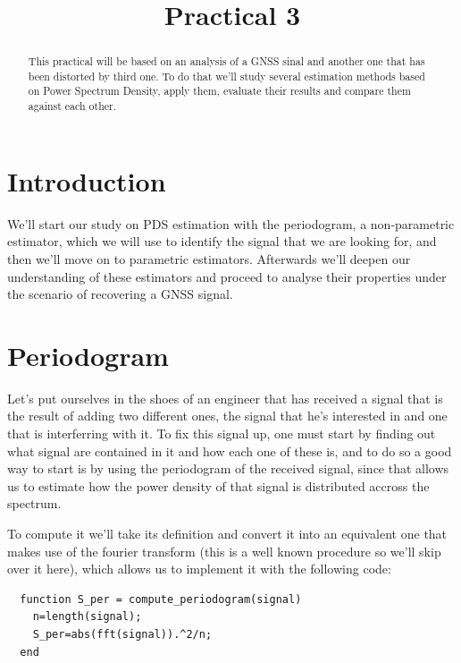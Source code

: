 \documentclass[conference,9pt]{IEEEtran}
\begin{document}
\title{Practical 3}

\author{
}


\maketitle
\begin{abstract}
This practical will be based on an analysis of a GNSS sinal and another one that has been distorted by third one. To do that we'll study several estimation methods based on Power Spectrum Density, apply them, evaluate their results and compare them against each other.
\end{abstract}

\section{Introduction}
We'll start our study on PDS estimation with the periodogram, a non-parametric estimator, which we will use to identify the signal that we are looking for, and then we'll move on to parametric estimators. Afterwards we'll deepen our understanding of these estimators and proceed to analyse their properties under the scenario of recovering a GNSS signal. 

\section{Periodogram}

Let's put ourselves in the shoes of an engineer that has received a signal that is the result of adding two different ones, the signal that he's interested in and one that is interferring with it. To fix this signal up, one must start by finding out what signal are contained in it and how each one of these is, and to do so a good way to start is by using the periodogram of the received signal, since that allows us to estimate how the power density of that signal is distributed accross the spectrum.

To compute it we'll take its definition and convert it into an equivalent one that makes use of the fourier transform (this is a well known procedure so we'll skip over it here), which allows us to implement it with the following code:
\begin{verbatim}
  function S_per = compute_periodogram(signal)
    n=length(signal);
    S_per=abs(fft(signal)).^2/n;
  end
\end{verbatim}
\end{document}
